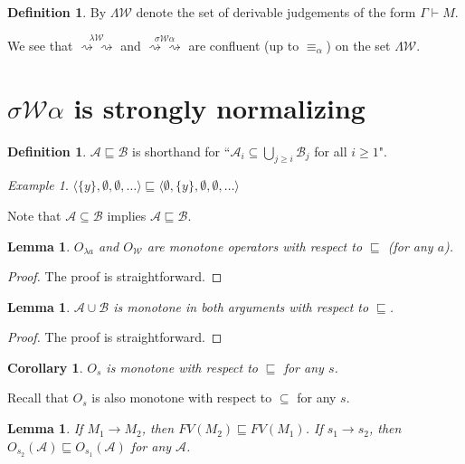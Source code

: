 \documentclass[11pt]{amsart}
\theoremstyle{plain}
\newtheorem{corollary}[theorem]{Corollary}
\newtheorem{lemma}[theorem]{Lemma}
\theoremstyle{definition}
\newtheorem{definition}[theorem]{Definition}
\theoremstyle{remark}
\newtheorem{example}[theorem]{Example}
\numberwithin{equation}{section}
\newcommand{\ri}{\rightsquigarrow}
\newcommand{\arrow}{\rightarrow}
\newcommand{\alp}{\equiv_{\alpha}}
\newcommand{\x}{a}
\renewcommand{\pi}{\mathcal{W}}
\begin{document}
\begin{definition}By $\Lambda\pi$ denote the set of derivable judgements of
the form $\Gamma\vdash M$.
\end{definition}
We see that $\overset{\lambda\pi}{\ri\ri}$ and
$\overset{\sigma\pi\alpha}{\ri\ri}$ are confluent (up to $\alp$)
on the set $\Lambda\pi$.
\newpage



\section{$\sigma\pi\alpha$ is strongly normalizing}\label{section9}
 \begin{definition}
  $\mathcal{A} \sqsubseteq \mathcal{B}$ is shorthand for
``$\mathcal{A}_i\subseteq\bigcup_{j\geqslant i}\mathcal{B}_j$ for
all $i\geqslant 1$".
\end{definition}
\begin{example}\label{examplepi}$\langle\{y\},\emptyset,\emptyset,\ldots\rangle\sqsubseteq\langle\emptyset,\{y\},\emptyset,\emptyset,\ldots\rangle$
\end{example}
Note that $\mathcal{A} \subseteq \mathcal{B}$ implies $\mathcal{A}
\sqsubseteq \mathcal{B}$.
\begin{lemma}$O_{\lambda \x}$ and $O_{\pi}$ are monotone
operators with respect to $\sqsubseteq$ (for any $\x$).
\end{lemma}
\begin{proof}The proof is straightforward.
\end{proof}
\begin{lemma}$\mathcal{A}\cup \mathcal{B}$ is monotone in both arguments with respect
to $\sqsubseteq$.
\end{lemma}
\begin{proof}The proof is straightforward.
\end{proof}
\begin{corollary}$O_s$ is monotone  with respect to $\sqsubseteq$ for any $s$.
\end{corollary}
Recall that $O_s$ is also monotone   with respect to $\subseteq$
for any $s$.
\begin{lemma}\label{subfreevar}
If $M_1\arrow M_2$, then $FV(M_2)\sqsubseteq FV(M_1)$. If
$s_1\arrow s_2$, then $O_{s_2}(\mathcal{A})\sqsubseteq
O_{s_1}(\mathcal{A})$ for any $\mathcal{A}$.
\end{lemma}
\end{document}
